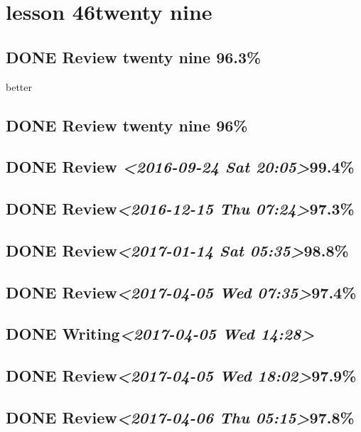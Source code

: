 \documentclass[11pt]{ctexart}
\begin{document}
\section{lesson 46twenty nine}
\label{sec:orge2a3a7f}
\subsection{{\bfseries\sffamily DONE} Review twenty nine 96.3\%}
\label{sec:org928e4bb}
better

\subsection{{\bfseries\sffamily DONE} Review twenty nine 96\%}
\label{sec:org3a8194b}

\subsection{{\bfseries\sffamily DONE} Review \textit{<2016-09-24 Sat 20:05>}99.4\%}
\label{sec:org6e3dce2}
\subsection{{\bfseries\sffamily DONE} Review\textit{<2016-12-15 Thu 07:24>}97.3\%}
\label{sec:org3fa9cf6}
\subsection{{\bfseries\sffamily DONE} Review\textit{<2017-01-14 Sat 05:35>}98.8\%}
\label{sec:org3b90fd3}
\subsection{{\bfseries\sffamily DONE} Review\textit{<2017-04-05 Wed 07:35>}97.4\%}
\label{sec:org0d7f58d}
\subsection{{\bfseries\sffamily DONE} Writing\textit{<2017-04-05 Wed 14:28>}}
\label{sec:org30cfdb5}
\subsection{{\bfseries\sffamily DONE} Review\textit{<2017-04-05 Wed 18:02>}97.9\%}
\label{sec:org7d6ad59}
\subsection{{\bfseries\sffamily DONE} Review\textit{<2017-04-06 Thu 05:15>}97.8\%}
\label{sec:org16640c3}
\end{document}
